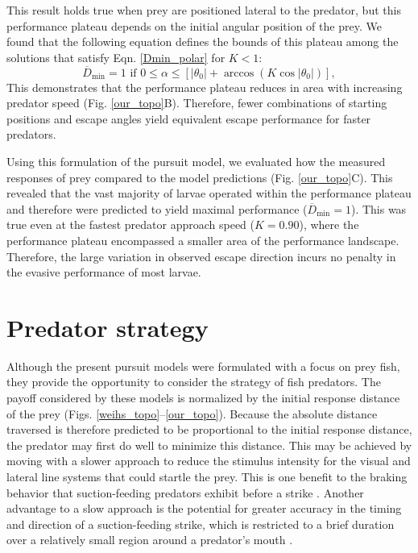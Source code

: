\documentclass[12pt]{article}
\newcommand{\ol}{\overline}
\begin{document}
This result holds true when prey are positioned lateral to the predator, but this performance plateau depends on the initial angular position of the prey. We found that the following equation defines the bounds of this plateau among the solutions that satisfy Eqn. \ref{Dmin_polar} for $K<1$:
%
\begin{equation}
\ol D_{\text{min}}=1 \text{ if }  0 \leq \alpha  \leq  [|\theta_0 |  + \arccos(K \cos | \theta_0 |)],
\label{plateau_eqn}
 \end{equation}
%
This demonstrates that the performance plateau reduces in area with increasing predator speed (Fig. \ref{our_topo}B). Therefore, fewer combinations of starting positions and escape angles yield equivalent escape performance for faster predators.

Using this formulation of the pursuit model, we evaluated how the measured responses of prey compared to the model predictions (Fig. \ref{our_topo}C). This revealed that the vast majority of larvae operated within the performance plateau and therefore were predicted to yield maximal performance ($\ol D_{\text{min}}=1$). 
This was true even at the fastest predator approach speed ($K=0.90$), where the performance plateau encompassed a smaller area of the performance landscape. Therefore, the large variation in observed escape direction incurs no penalty in the evasive performance of most larvae. 


\section{Predator strategy}

Although the present pursuit models were formulated with a focus on prey fish, they provide the opportunity to consider the strategy of fish predators. The payoff considered by these models is normalized by the initial response distance of the prey (Figs. \ref{weihs_topo}--\ref{our_topo}). Because the absolute distance traversed is therefore predicted to be proportional to the initial response distance, the predator may first do well to minimize this distance. 
This may be achieved by moving with a slower approach to reduce the stimulus intensity for the visual \citep{Dill:1974ws} and lateral line \citep{Stewart:2014cm} systems that could startle the prey. This is one benefit to the braking behavior that suction-feeding predators exhibit before a strike \citep{Higham:2007go, Higham:2005iu}. 
Another advantage to a slow approach is the potential for greater accuracy in the timing and direction of a suction-feeding strike, which is restricted to a brief duration over a relatively small region around a predator's mouth \citep{Wainwright:2001ufa}. 
\end{document}
